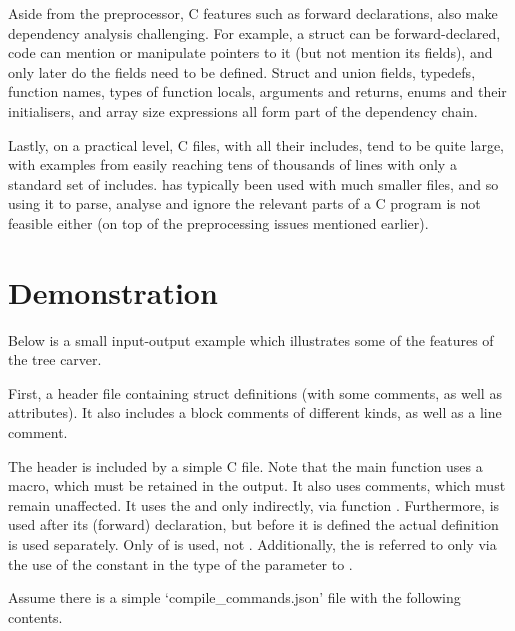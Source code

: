 Aside from the preprocessor, C features such as forward declarations, also make
dependency analysis challenging. For example, a struct can be forward-declared,
code can mention or manipulate pointers to it (but not mention its fields), and
only later do the fields need to be defined. Struct and union fields, typedefs,
function names, types of function locals, arguments and returns, enums and
their initialisers, and array size expressions all form part of the dependency
chain.

Lastly, on a practical level, C files, with all their includes, tend to be
quite large, with examples from  easily reaching tens of thousands of
lines with only a standard set of includes.  has typically been
used with much smaller files, and so using it to parse, analyse and ignore the
relevant parts of a C program is not feasible either (on top of the
preprocessing issues mentioned earlier).

\section{Demonstration}

Below is a small input-output example which illustrates some of the features
of the tree carver.

First, a header file containing struct definitions (with some comments, as well
as attributes). It also includes a block comments of different kinds, as well
as a line comment.


The header is included by a simple C file. Note that the main function uses a
macro, which must be retained in the output. It also uses comments, which must
remain unaffected. It uses the  and  only
indirectly, via function . Furthermore,  is used
after its (forward) declaration, but before it is defined \textemdash{} the
actual definition is used separately.  Only  of
 is used, not . Additionally, the
 is referred to only via the use of the constant
 in the type of the parameter to .


Assume there is a simple `compile\_commands.json' file with the following
contents.

